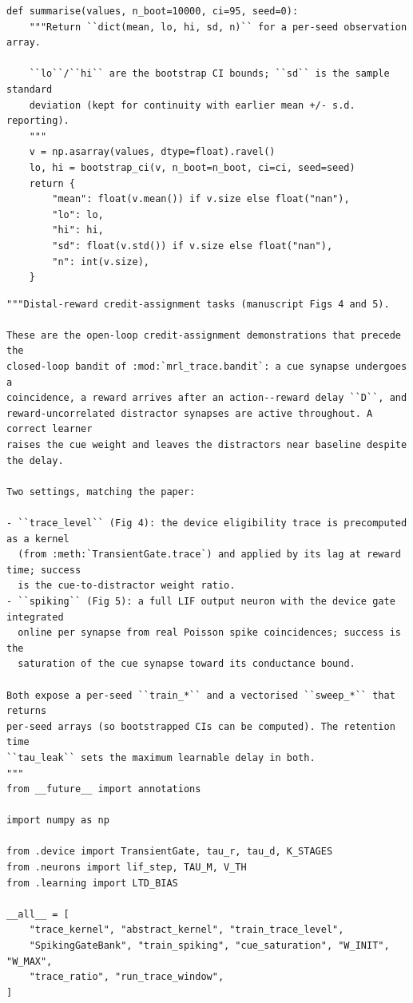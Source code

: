 \begin{lstlisting}[caption={mrl\_trace/stats.py},label={lst:siox-src-stats}]
def summarise(values, n_boot=10000, ci=95, seed=0):
    """Return ``dict(mean, lo, hi, sd, n)`` for a per-seed observation array.

    ``lo``/``hi`` are the bootstrap CI bounds; ``sd`` is the sample standard
    deviation (kept for continuity with earlier mean +/- s.d. reporting).
    """
    v = np.asarray(values, dtype=float).ravel()
    lo, hi = bootstrap_ci(v, n_boot=n_boot, ci=ci, seed=seed)
    return {
        "mean": float(v.mean()) if v.size else float("nan"),
        "lo": lo,
        "hi": hi,
        "sd": float(v.std()) if v.size else float("nan"),
        "n": int(v.size),
    }
\end{lstlisting}

\begin{lstlisting}[caption={mrl\_trace/distal\_reward.py},label={lst:siox-src-distal_reward}]
"""Distal-reward credit-assignment tasks (manuscript Figs 4 and 5).

These are the open-loop credit-assignment demonstrations that precede the
closed-loop bandit of :mod:`mrl_trace.bandit`: a cue synapse undergoes a
coincidence, a reward arrives after an action--reward delay ``D``, and
reward-uncorrelated distractor synapses are active throughout. A correct learner
raises the cue weight and leaves the distractors near baseline despite the delay.

Two settings, matching the paper:

- ``trace_level`` (Fig 4): the device eligibility trace is precomputed as a kernel
  (from :meth:`TransientGate.trace`) and applied by its lag at reward time; success
  is the cue-to-distractor weight ratio.
- ``spiking`` (Fig 5): a full LIF output neuron with the device gate integrated
  online per synapse from real Poisson spike coincidences; success is the
  saturation of the cue synapse toward its conductance bound.

Both expose a per-seed ``train_*`` and a vectorised ``sweep_*`` that returns
per-seed arrays (so bootstrapped CIs can be computed). The retention time
``tau_leak`` sets the maximum learnable delay in both.
"""
from __future__ import annotations

import numpy as np

from .device import TransientGate, tau_r, tau_d, K_STAGES
from .neurons import lif_step, TAU_M, V_TH
from .learning import LTD_BIAS

__all__ = [
    "trace_kernel", "abstract_kernel", "train_trace_level",
    "SpikingGateBank", "train_spiking", "cue_saturation", "W_INIT", "W_MAX",
    "trace_ratio", "run_trace_window",
]


\end{lstlisting}

